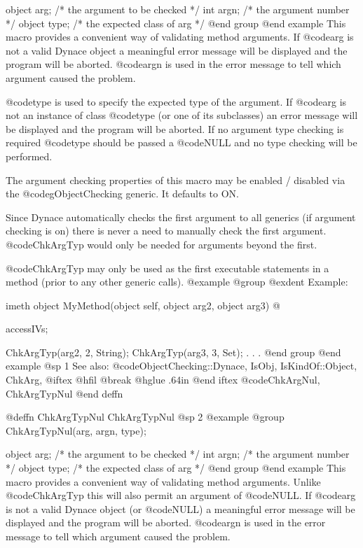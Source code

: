 {{object  arg;    /*  the argument to be checked  */
int     argn;   /*  the argument number         */
object  type;   /*  the expected class of arg   */
@end group
@end example
This macro provides a convenient way of validating method arguments.
If @code{arg} is not a valid Dynace object a meaningful error message
will be displayed and the program will be aborted.  @code{argn} is
used in the error message to tell which argument caused the problem.

@code{type} is used to specify the expected type of the argument.  If
@code{arg} is not an instance of class @code{type} (or one of its
subclasses) an error message will be displayed and the program will be
aborted.  If no argument type checking is required @code{type} should
be passed a @code{NULL} and no type checking will be performed.

The argument checking properties of this macro may be enabled / disabled
via the @code{gObjectChecking} generic.  It defaults to ON.

Since Dynace automatically checks the first argument to all generics (if
argument checking is on) there is never a need to manually check the
first argument.  @code{ChkArgTyp} would only be needed for arguments
beyond the first.

@code{ChkArgTyp} may only be used as the first executable statements in a
method (prior to any other generic calls).
@example
@group
@exdent Example:

imeth object  MyMethod(object self, object arg2, object arg3)
@{
        accessIVs;

        ChkArgTyp(arg2, 2, String);
        ChkArgTyp(arg3, 3, Set);
        .
        .
        .
@end group
@end example
@sp 1
See also:  @code{ObjectChecking::Dynace, IsObj, IsKindOf::Object, ChkArg,}
@iftex
@hfil @break @hglue .64in 
@end iftex
@code{ChkArgNul, ChkArgTypNul}
@end deffn











@deffn {ChkArgTypNul} ChkArgTypNul
@sp 2
@example
@group
ChkArgTypNul(arg, argn, type);

object  arg;    /*  the argument to be checked  */
int     argn;   /*  the argument number         */
object  type;   /*  the expected class of arg   */
@end group
@end example
This macro provides a convenient way of validating method arguments.
Unlike @code{ChkArgTyp} this will also permit an argument of
@code{NULL}.  If @code{arg} is not a valid Dynace object (or
@code{NULL}) a meaningful error message will be displayed and the
program will be aborted.  @code{argn} is used in the error message to
tell which argument caused the problem.

}}}
